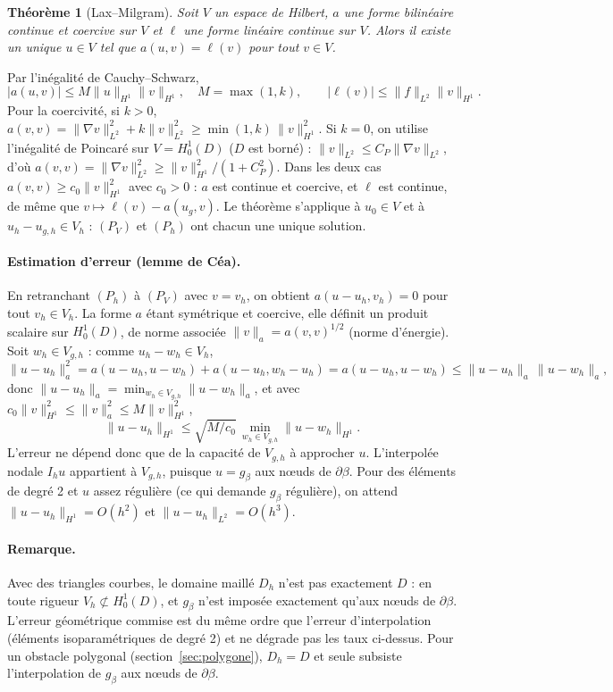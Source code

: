 \documentclass[11pt,a4paper]{article}
\newtheorem*{theoreme}{Théorème}
\begin{document}
\begin{theoreme}[Lax--Milgram]
Soit $V$ un espace de Hilbert, $a$ une forme bilinéaire continue et
coercive sur $V$ et $\ell$ une forme linéaire continue sur $V$. Alors il
existe un unique $u \in V$ tel que $a(u,v) = \ell(v)$ pour tout $v \in V$.
\end{theoreme}

Par l'inégalité de Cauchy--Schwarz,
\[
|a(u,v)| \le M \|u\|_{H^1} \|v\|_{H^1},
\quad M = \max(1, k),
\qquad
|\ell(v)| \le \|f\|_{L^2} \|v\|_{H^1} .
\]
Pour la coercivité, si $k > 0$, $a(v,v) = \|\nabla v\|_{L^2}^2 +
k\|v\|_{L^2}^2 \ge \min(1, k)\, \|v\|_{H^1}^2$. Si $k = 0$, on utilise
l'inégalité de Poincaré sur $V = H^1_0(D)$ ($D$ est borné) :
$\|v\|_{L^2} \le C_P \|\nabla v\|_{L^2}$, d'où
$a(v,v) = \|\nabla v\|_{L^2}^2 \ge \|v\|_{H^1}^2 / (1 + C_P^2)$. Dans
les deux cas $a(v,v) \ge c_0 \|v\|_{H^1}^2$ avec $c_0 > 0$ : $a$ est
continue et coercive, et $\ell$ est continue, de même que
$v \mapsto \ell(v) - a(u_g, v)$. Le théorème s'applique à
$u_0 \in V$ et à $u_h - u_{g,h} \in V_h$ : $(P_V)$ et $(P_h)$ ont chacun une
unique solution.

\paragraph{Estimation d'erreur (lemme de Céa).} En retranchant $(P_h)$ à
$(P_V)$ avec $v = v_h$, on obtient $a(u - u_h, v_h) = 0$ pour tout
$v_h \in V_h$. La forme $a$ étant symétrique et coercive, elle définit un
produit scalaire sur $H^1_0(D)$, de norme associée
$\|v\|_a = a(v,v)^{1/2}$ (norme d'énergie). Soit $w_h \in V_{g,h}$ : comme
$u_h - w_h \in V_h$,
\[
\|u - u_h\|_a^2 = a(u - u_h, u - w_h) + a(u - u_h, w_h - u_h)
= a(u - u_h, u - w_h) \le \|u - u_h\|_a\, \|u - w_h\|_a,
\]
donc $\|u - u_h\|_a = \min_{w_h \in V_{g,h}} \|u - w_h\|_a$, et avec
$c_0 \|v\|_{H^1}^2 \le \|v\|_a^2 \le M \|v\|_{H^1}^2$,
\[
\|u - u_h\|_{H^1} \le \sqrt{M / c_0}\, \min_{w_h \in V_{g,h}} \|u - w_h\|_{H^1} .
\]
L'erreur ne dépend donc que de la capacité de $V_{g,h}$ à approcher $u$.
L'interpolée nodale $I_h u$ appartient à $V_{g,h}$, puisque
$u = g_\beta$ aux nœuds de $\partial\beta$. Pour des éléments de degré 2 et
$u$ assez régulière (ce qui demande $g_\beta$ régulière), on attend
$\|u - u_h\|_{H^1} = O(h^2)$ et $\|u - u_h\|_{L^2} = O(h^3)$.

\paragraph{Remarque.} Avec des triangles courbes, le domaine maillé $D_h$
n'est pas exactement $D$ : en toute rigueur $V_h \not\subset H^1_0(D)$, et
$g_\beta$ n'est imposée exactement qu'aux nœuds de $\partial\beta$.
L'erreur géométrique commise est du même ordre que l'erreur d'interpolation
(éléments isoparamétriques de degré 2) et ne dégrade pas les taux ci-dessus.
Pour un obstacle polygonal (section~\ref{sec:polygone}), $D_h = D$ et
seule subsiste l'interpolation de $g_\beta$ aux nœuds de $\partial\beta$.
\end{document}
